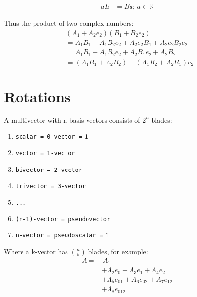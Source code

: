\documentclass[twoside]{article}
\begin{document}
\begin{multicols*}{2}
$$\begin{aligned}
                    aB &= Ba;\, a \in \mathbb{R}
                \end{aligned}$$
            \vfill\null\columnbreak
            \par
                Thus the product of two complex numbers:
                $$\begin{aligned}
                    & (A_1 + A_2 e_2)(B_1 + B_2 e_2) \\
                    & = A_1 B_1 + A_1 B_2 e_2 + A_2 e_2 B_1 + A_2 e_2 B_2 e_2 \\
                    & = A_1 B_1 + A_1 B_2 e_2 + A_2 B_1 e_2 + A_2 B_2 \\
                    & = (A_1 B_1 + A_2 B_2) + (A_1 B_2 + A_2 B_1) e_2
                \end{aligned}$$
        \section{Rotations}
            \par
                A multivector with n basis vectors consists of $ 2^n $ blades:
                \begin{enumerate}[-]
                    \item \texttt{scalar = 0-vector =} $\mathbf{1}$
                    \item \texttt{vector = 1-vector}
                    \item \texttt{bivector = 2-vector}
                    \item \texttt{trivector = 3-vector}
                    \item \texttt{...}
                    \item \texttt{(n-1)-vector = pseudovector}
                    \item \texttt{n-vector = pseudoscalar =} $\mathbb{1}$
                \end{enumerate} \vspace{5px}
                Where a k-vector has $n \choose k$ blades, for example:
                $$\begin{aligned}
                    A = & \, A_1 \\
                    &+ A_2 e_0 + A_3 e_1 + A_4 e_2 \\
                    &+ A_5 e_{01} + A_6 e_{02} + A_7 e_{12} \\
                    &+ A_8 e_{012} \\
                \end{aligned}$$

\end{multicols*}
\end{document}
